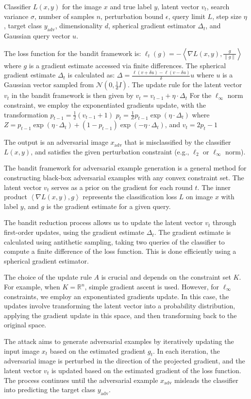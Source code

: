 Classifier $L(x, y)$ for the image $x$ and true label $y$, latent vector $v_t$, search variance $\sigma$, number of samples $n$, perturbation bound $\epsilon$, query limit $L$, step size $\eta$, target class $y_{\text{adv}}$, dimensionality $d$, spherical gradient estimator $\Delta_t$, and Gaussian query vector $u$.

The loss function for the bandit framework is:
$\ell_t(g) = -\left\langle \nabla L(x, y), \frac{g}{\|g\|} \right\rangle$
where $g$ is a gradient estimate accessed via finite differences. The spherical gradient estimate $\Delta_t$ is calculated as:
$\Delta = \frac{\ell(v + \delta u) - \ell(v - \delta u)}{\delta} u$
where $u$ is a Gaussian vector sampled from $\mathcal{N}(0, \frac{1}{d} I)$. The update rule for the latent vector $v_t$ in the bandit framework is then given by $v_t = v_{t-1} + \eta \cdot \Delta_t$
For the $\ell_\infty$ norm constraint, we employ the exponentiated gradients update, with the transformation $p_{t-1} = \frac{1}{2} (v_{t-1} + 1)$
$p_t = \frac{1}{Z} p_{t-1} \exp(\eta \cdot \Delta_t)$
where $Z = p_{t-1} \exp(\eta \cdot \Delta_t) + (1 - p_{t-1}) \exp(-\eta \cdot \Delta_t)$, and $v_t = 2p_t - 1$

The output is an adversarial image $x_{\text{adv}}$ that is misclassified by the classifier $L(x, y)$, and satisfies the given perturbation constraint (e.g., $\ell_2$ or $\ell_\infty$ norm).

The bandit framework for adversarial example generation is a general method for constructing black-box adversarial examples with any convex constraint set. The latent vector $v_t$ serves as a prior on the gradient for each round $t$. The inner product $\left\langle \nabla L(x, y), g \right\rangle$ represents the classification loss $L$ on image $x$ with label $y$, and $g$ is the gradient estimate for a given query. 

The bandit reduction process allows us to update the latent vector $v_t$ through first-order updates, using the gradient estimate $\Delta_t$. The gradient estimate is calculated using antithetic sampling, taking two queries of the classifier to compute a finite difference of the loss function. This is done efficiently using a spherical gradient estimator.

The choice of the update rule $A$ is crucial and depends on the constraint set $K$. For example, when $K = \mathbb{R}^n$, simple gradient ascent is used. However, for $\ell_\infty$ constraints, we employ an exponentiated gradients update. In this case, the updates involve transforming the latent vector into a probability distribution, applying the gradient update in this space, and then transforming back to the original space.

The attack aims to generate adversarial examples by iteratively updating the input image $x_t$ based on the estimated gradient $g_t$. In each iteration, the adversarial image is perturbed in the direction of the projected gradient, and the latent vector $v_t$ is updated based on the estimated gradient of the loss function. The process continues until the adversarial example $x_{\text{adv}}$ misleads the classifier into predicting the target class $y_{\text{adv}}$.


